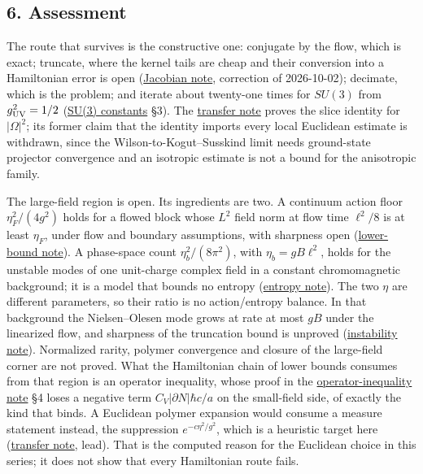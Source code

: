 \documentclass[11pt,a4paper]{article}
\begin{document}
\hypertarget{assessment}{%
\subsection{6. Assessment}\label{assessment}}

The route that survives is the constructive one: conjugate by the flow,
which is exact; truncate, where the kernel tails are cheap and their
conversion into a Hamiltonian error is open
(\href{flow-jacobian-truncation-error.md}{Jacobian note}, correction of
2026-10-02); decimate, which is the problem; and iterate about
twenty-one times for \(SU(3)\) from \(g_{\rm UV}^2=1/2\)
(\href{su3-constants.md}{SU(3) constants} §3). The
\href{ground-state-measure-transfer.md}{transfer note} proves the slice
identity for \(|\Omega|^2\); its former claim that the identity imports
every local Euclidean estimate is withdrawn, since the
Wilson-to-Kogut--Susskind limit needs ground-state projector convergence
and an isotropic estimate is not a bound for the anisotropic family.

The large-field region is open. Its ingredients are two. A continuum
action floor \(\eta_F^2/(4g^2)\) holds for a flowed block whose \(L^2\)
field norm at flow time \(\ell^2/8\) is at least \(\eta_F\), under flow
and boundary assumptions, with sharpness open
(\href{large-field-action-lower-bound.md}{lower-bound note}). A
phase-space count \(\eta_b^2/(8\pi^2)\), with \(\eta_b=gB\ell^2\), holds
for the unstable modes of one unit-charge complex field in a constant
chromomagnetic background; it is a model that bounds no entropy
(\href{large-field-entropy-count.md}{entropy note}). The two \(\eta\)
are different parameters, so their ratio is no action/entropy balance.
In that background the Nielsen--Olesen mode grows at rate at most \(gB\)
under the linearized flow, and sharpness of the truncation bound is
unproved (\href{flow-instability-large-field.md}{instability note}).
Normalized rarity, polymer convergence and closure of the large-field
corner are not proved. What the Hamiltonian chain of lower bounds
consumes from that region is an operator inequality, whose proof in the
\href{large-field-operator-inequality.md}{operator-inequality note} §4
loses a negative term \(C_V|\partial N|\hbar c/a\) on the small-field
side, of exactly the kind that binds. A Euclidean polymer expansion
would consume a measure statement instead, the suppression
\(e^{-c\eta^2/g^2}\), which is a heuristic target here
(\href{ground-state-measure-transfer.md}{transfer note}, lead). That is
the computed reason for the Euclidean choice in this series; it does not
show that every Hamiltonian route fails.
\end{document}
